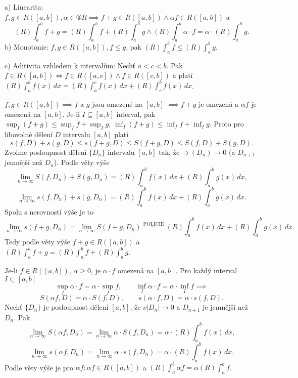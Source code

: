 \documentclass[12pt]{article}                   %
\begin{document}
        \begin{veta}
            a) Linearita: $f, g \in R([a, b]), \alpha \in ®R \implies f+g \in R([a, b]) \land \alpha f \in R([a, b])$ a 
            $$ (R) \int_a^b f + g = (R) \int_a^b f + (R) \int_a^b g \land (R) \int_a^b \alpha·f = \alpha·(R) \int_a^b g. $$
            b) Monotonie: $f, g \in R([a, b]), f ≤ g$, pak $(R) \int_a^b f ≤ (R) \int_a^b g$.

            c) Aditivita vzhledem k intervalům: Nechť $a < c < b$. Pak $f\in R([a, b]) \Leftrightarrow f \in R([a, c]) \land f \in R([c, b])$ a platí $(R) \int_a^b f(x)\,dx = (R) \int_a^c f(x)\,dx + (R) \int_c^b f(x)\,dx$.

            \begin{dukazin}[a]
                $f, g \in R([a, b]) \implies f$ a $g$ jsou omezené na $[a, b]$ $\implies f + g$ je omezená a $\alpha f$ je omezená na $[a, b]$. Je-li $I \subseteq [a, b]$ interval, pak $\sup_I(f+g) ≤ \sup_I f + \sup_I g$, $\inf_I(f+g) ≤ \inf_I f + \inf_I g$. Proto pro libovolné dělení $D$ intervalu $[a, b]$ platí
                $$ s(f, D) + s(g, D) ≤ s(f + g, D) ≤ S(f + g, D) ≤ S(f, D) + S(g, D). $$
                Zvolme posloupnost dělení $\{D_n\}$ intervalu $[a, b]$ tak, že $\ni(D_n) \rightarrow 0$ (a $D_{n+1}$ jemnější než $D_n$). Podle věty výše
                $$ \lim_{n \rightarrow ∞} S(f, D_n) + S(g, D_n) = (R) \int_a^b f(x)\,dx + (R) \int_a^b g(x)\,dx, $$
                $$ \lim_{n \rightarrow ∞} s(f, D_n) + s(g, D_n) = (R) \int_a^b f(x)\,dx + (R) \int_a^b g(x)\,dx. $$
                Spolu s nerovností výše je to
                $$ \lim_{n \rightarrow ∞} s(f+g, D_n) = \lim_{n \rightarrow ∞} S(f + g, D_n) \overset{\text{POLICIE}}{=} (R) \int_a^b f(x)\,dx + (R) \int_a^b g(x)\,dx. $$
                Tedy podle věty výše $f+g \in R([a, b])$ a $(R) \int_a^b f + g = (R) \int_a^b f + (R) \int_a^b g$.

                Je-li $f \in R([a, b])$, $\alpha ≥ 0$, je $\alpha·f$ omezená na $[a, b]$. Pro každý interval $I \subseteq [a, b]$
                $$ \sup_I \alpha·f = \alpha·\sup_I f, \qquad \inf_I \alpha·f = \alpha·\inf_I f \implies $$
                $$ S(\alpha f, D) = \alpha·S(f, D), \qquad s(\alpha·f, D) = \alpha·s(f, D). $$
                Nechť $\{D_n\}$ je posloupnost dělení $[a, b]$, že $\nu|D_n| \rightarrow 0$ a $D_{n+1}$ je jemnější než $D_n$. Pak
                $$ \lim_{n \rightarrow ∞} S(\alpha f, D_n) = \lim_{n \rightarrow ∞} \alpha·S(f, D_n) = \alpha·(R) \int_a^b f(x)\,dx, $$
                $$ \lim_{n \rightarrow ∞} s(\alpha f, D_n) = \lim_{n \rightarrow ∞} \alpha·s(f, D_n) = \alpha·(R) \int_a^b f(x)\,dx. $$
                Podle věty výše je pro $\alpha f: \alpha f \in R([a, b])$ a $(R)\int_a^b \alpha f = \alpha (R)\int_a^b f$.


\end{dukazin}
\end{veta}
\end{document}
